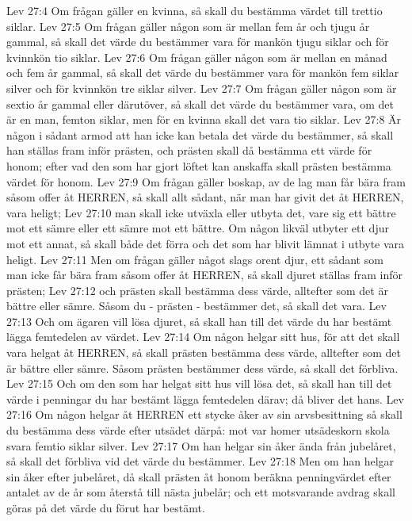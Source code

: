 Lev 27:4  Om frågan gäller en kvinna, så skall du bestämma värdet till trettio siklar.
Lev 27:5  Om frågan gäller någon som är mellan fem år och tjugu år gammal, så skall det värde du bestämmer vara för mankön tjugu siklar och för kvinnkön tio siklar.
Lev 27:6  Om frågan gäller någon som är mellan en månad och fem år gammal, så skall det värde du bestämmer vara för mankön fem siklar silver och för kvinnkön tre siklar silver.
Lev 27:7  Om frågan gäller någon som är sextio år gammal eller därutöver, så skall det värde du bestämmer vara, om det är en man, femton siklar, men för en kvinna skall det vara tio siklar.
Lev 27:8  Är någon i sådant armod att han icke kan betala det värde du bestämmer, så skall han ställas fram inför prästen, och prästen skall då bestämma ett värde för honom; efter vad den som har gjort löftet kan anskaffa skall prästen bestämma värdet för honom.
Lev 27:9  Om frågan gäller boskap, av de lag man får bära fram såsom offer åt HERREN, så skall allt sådant, när man har givit det åt HERREN, vara heligt;
Lev 27:10  man skall icke utväxla eller utbyta det, vare sig ett bättre mot ett sämre eller ett sämre mot ett bättre. Om någon likväl utbyter ett djur mot ett annat, så skall både det förra och det som har blivit lämnat i utbyte vara heligt.
Lev 27:11  Men om frågan gäller något slags orent djur, ett sådant som man icke får bära fram såsom offer åt HERREN, så skall djuret ställas fram inför prästen;
Lev 27:12  och prästen skall bestämma dess värde, alltefter som det är bättre eller sämre. Såsom du - prästen - bestämmer det, så skall det vara.
Lev 27:13  Och om ägaren vill lösa djuret, så skall han till det värde du har bestämt lägga femtedelen av värdet.
Lev 27:14  Om någon helgar sitt hus, för att det skall vara helgat åt HERREN, så skall prästen bestämma dess värde, alltefter som det är bättre eller sämre. Såsom prästen bestämmer dess värde, så skall det förbliva.
Lev 27:15  Och om den som har helgat sitt hus vill lösa det, så skall han till det värde i penningar du har bestämt lägga femtedelen därav; då bliver det hans.
Lev 27:16  Om någon helgar åt HERREN ett stycke åker av sin arvsbesittning så skall du bestämma dess värde efter utsädet därpå: mot var homer utsädeskorn skola svara femtio siklar silver.
Lev 27:17  Om han helgar sin åker ända från jubelåret, så skall det förbliva vid det värde du bestämmer.
Lev 27:18  Men om han helgar sin åker efter jubelåret, då skall prästen åt honom beräkna penningvärdet efter antalet av de år som återstå till nästa jubelår; och ett motsvarande avdrag skall göras på det värde du förut har bestämt.
